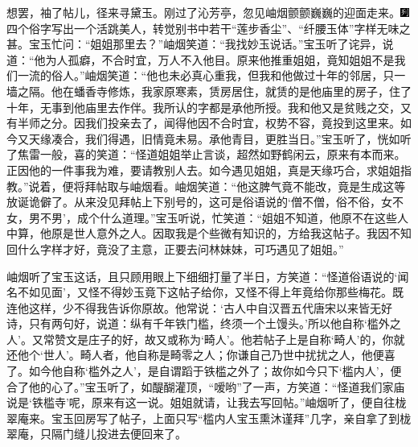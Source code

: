想罢，袖了帖儿，径来寻黛玉。刚过了沁芳亭，忽见岫烟颤颤巍巍的迎面走来。{\includegraphics[width=3mm]{../Images/00007}四个俗字写出一个活跳美人，转觉别书中若干“莲步香尘”、“纤腰玉体”字样无味之甚。}宝玉忙问：“姐姐那里去？”岫烟笑道：“我找妙玉说话。”宝玉听了诧异，说道：“他为人孤癖，不合时宜，万人不入他目。原来他推重姐姐，竟知姐姐不是我们一流的俗人。”岫烟笑道：“他也未必真心重我，但我和他做过十年的邻居，只一墙之隔。他在蟠香寺修炼，我家原寒素，赁房居住，就赁的是他庙里的房子，住了十年，无事到他庙里去作伴。我所认的字都是承他所授。我和他又是贫贱之交，又有半师之分。因我们投亲去了，闻得他因不合时宜，权势不容，竟投到这里来。如今又天缘凑合，我们得遇，旧情竟未易。承他青目，更胜当日。”宝玉听了，恍如听了焦雷一般，喜的笑道：“怪道姐姐举止言谈，超然如野鹤闲云，原来有本而来。正因他的一件事我为难，要请教别人去。如今遇见姐姐，真是天缘巧合，求姐姐指教。”说着，便将拜帖取与岫烟看。岫烟笑道：“他这脾气竟不能改，竟是生成这等放诞诡僻了。从来没见拜帖上下别号的，这可是俗语说的‘僧不僧，俗不俗，女不女，男不男’，成个什么道理。”宝玉听说，忙笑道：“姐姐不知道，他原不在这些人中算，他原是世人意外之人。因取我是个些微有知识的，方给我这帖子。我因不知回什么字样才好，竟没了主意，正要去问林妹妹，可巧遇见了姐姐。”

岫烟听了宝玉这话，且只顾用眼上下细细打量了半日，方笑道：“怪道俗语说的‘闻名不如见面’，又怪不得妙玉竟下这帖子给你，又怪不得上年竟给你那些梅花。既连他这样，少不得我告诉你原故。他常说：‘古人中自汉晋五代唐宋以来皆无好诗，只有两句好，说道：纵有千年铁门槛，终须一个土馒头。’所以他自称‘槛外之人’。又常赞文是庄子的好，故又或称为‘畸人’。他若帖子上是自称‘畸人’的，你就还他个‘世人’。畸人者，他自称是畸零之人；你谦自己乃世中扰扰之人，他便喜了。如今他自称‘槛外之人’，是自谓蹈于铁槛之外了；故你如今只下‘槛内人’，便合了他的心了。”宝玉听了，如醍醐灌顶，“嗳哟”了一声，方笑道：“怪道我们家庙说是‘铁槛寺’呢，原来有这一说。姐姐就请，让我去写回帖。”岫烟听了，便自往栊翠庵来。宝玉回房写了帖子，上面只写“槛内人宝玉熏沐谨拜”几字，亲自拿了到栊翠庵，只隔门缝儿投进去便回来了。

